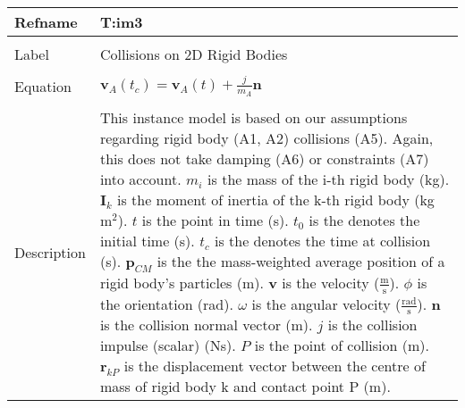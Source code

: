 \documentclass[12pt]{article}
\begin{document}
\noindent \begin{minipage}{\textwidth}
\begin{tabular}{p{} p{}}
\toprule \textbf{Refname} & \textbf{T:im3}
\label{T:im3}
\\ \midrule \\
Label & Collisions on 2D Rigid Bodies
\\ \midrule \\
Equation & ${\mathbf{v}_{A}}\left({t_{c}}\right)={\mathbf{v}_{A}}\left(t\right)+\frac{j}{{m_{A}}} \mathbf{n}$
\\ \midrule \\
Description & This instance model is based on our assumptions regarding rigid body (A1, A2) collisions (A5). Again, this does not take damping (A6) or constraints (A7) into account. ${m_{i}}$ is the mass of the i-th rigid body (kg). ${\mathbf{I}_{k}}$ is the moment of inertia of the k-th rigid body (kg$\text{m}^{2}$). $t$ is the point in time (s). ${t_{0}}$ is the denotes the initial time (s). ${t_{c}}$ is the denotes the time at collision (s). ${\mathbf{p}_{CM}}$ is the the mass-weighted average position of a rigid body's particles (m). $\mathbf{v}$ is the velocity ($\frac{\text{m}}{\text{s}}$). $\phi{}$ is the orientation (rad). $\omega{}$ is the angular velocity ($\frac{\text{rad}}{\text{s}}$). $\mathbf{n}$ is the collision normal vector (m). $j$ is the collision impulse (scalar) (Ns). $P$ is the point of collision (m). ${\mathbf{r}_{kP}}$ is the displacement vector between the centre of mass of rigid body k and contact point P (m).
\\ \bottomrule \end{tabular}
\end{minipage}\\
\end{document}
